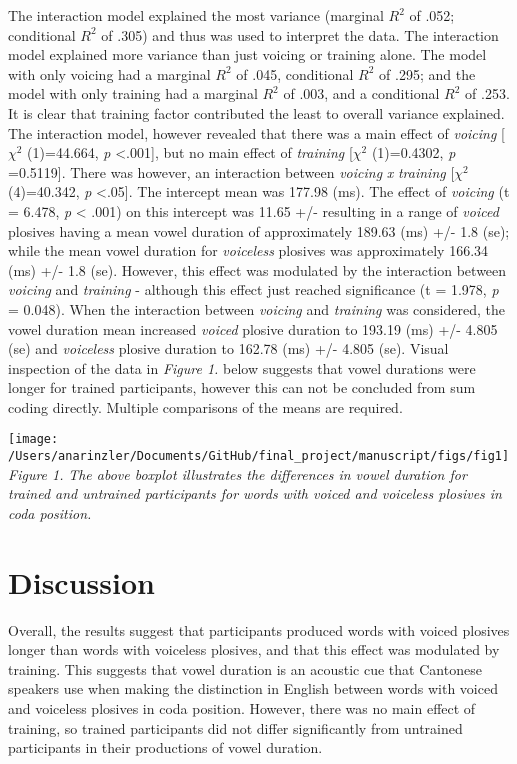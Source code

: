 \documentclass[man]{apa6}
\theoremstyle{definition}
\theoremstyle{definition}
\theoremstyle{definition}
\theoremstyle{remark}
\begin{document}
The interaction model explained the most variance (marginal \(R^2\) of
.052; conditional \(R^2\) of .305) and thus was used to interpret the
data. The interaction model explained more variance than just voicing or
training alone. The model with only voicing had a marginal \(R^2\) of
.045, conditional \(R^2\) of .295; and the model with only training had
a marginal \(R^2\) of .003, and a conditional \(R^2\) of .253. It is
clear that training factor contributed the least to overall variance
explained. The interaction model, however revealed that there was a main
effect of \emph{voicing} {[}\(\chi^2\) (1)=44.664, \emph{p}
\textless{}.001{]}, but no main effect of \emph{training} {[}\(\chi^2\)
(1)=0.4302, \emph{p} =0.5119{]}. There was however, an interaction
between \emph{voicing} \emph{x} \emph{training} {[}\(\chi^2\)
(4)=40.342, \emph{p} \textless{}.05{]}. The intercept mean was 177.98
(ms). The effect of \emph{voicing} (t = 6.478, \emph{p} \textless{}
.001) on this intercept was 11.65 +/- resulting in a range of
\emph{voiced} plosives having a mean vowel duration of approximately
189.63 (ms) +/- 1.8 (se); while the mean vowel duration for
\emph{voiceless} plosives was approximately 166.34 (ms) +/- 1.8 (se).
However, this effect was modulated by the interaction between
\emph{voicing} and \emph{training} - although this effect just reached
significance (t = 1.978, \emph{p} = 0.048). When the interaction between
\emph{voicing} and \emph{training} was considered, the vowel duration
mean increased \emph{voiced} plosive duration to 193.19 (ms) +/- 4.805
(se) and \emph{voiceless} plosive duration to 162.78 (ms) +/- 4.805
(se). Visual inspection of the data in \emph{Figure 1.} below suggests
that vowel durations were longer for trained participants, however this
can not be concluded from sum coding directly. Multiple comparisons of
the means are required.

\texttt{[image: /Users/anarinzler/Documents/GitHub/final\_project/manuscript/figs/fig1]}
\emph{Figure 1.} \emph{The above boxplot illustrates the differences in
vowel duration for trained and untrained participants for words with
voiced and voiceless plosives in coda position.}

\section{Discussion}\label{discussion}

Overall, the results suggest that participants produced words with
voiced plosives longer than words with voiceless plosives, and that this
effect was modulated by training. This suggests that vowel duration is
an acoustic cue that Cantonese speakers use when making the distinction
in English between words with voiced and voiceless plosives in coda
position. However, there was no main effect of training, so trained
participants did not differ significantly from untrained participants in
their productions of vowel duration.
\end{document}
